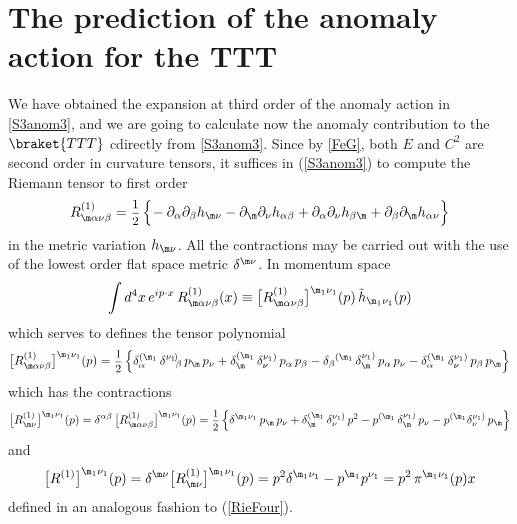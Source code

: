 \documentclass[a4paper,11pt,openright,twoside]{book}
\let\a=\alpha   \let\b=\beta   \let\g=\gamma   \let\d=\delta
\let\n=\nu      \let\x=\xi     \let\p=\pi      \let\r=\rho
\newcommand{\sdfrac}[2]{\mbox{\small$\displaystyle\frac{#1}{#2}$}}
\numberwithin{equation}{section}
\begin{document}
{{\section{The prediction of the anomaly action for the TTT}
\label{Sec:AnomTTT}
{
We have obtained the expansion at third order of the anomaly action in \eqref{S3anom3}, and we are going to calculate now the anomaly contribution to the $\braket{TTT}$ cdirectly from \eqref{S3anom3}. Since by \eqref{FeG}, both $E$ and $C^2$ are second order in curvature tensors, it suffices in (\ref{S3anom3}) to compute the Riemann tensor to first order
\begin{equation}
	R_{\m\a\n\beta}^{(1)} = \sdfrac{1}{2}\, \Big\{\!- \partial_\a\partial_\beta h_{\m\n}- \partial_\m\partial_\n h_{\a\beta} + \partial_\a\partial_\n h_{\b\m}
	+ \partial_\b\partial_\m h_{\a\n}\Big\}
\end{equation}
in the metric variation $h_{\m\n}$. All the contractions may be carried out with the use of the lowest order
flat space metric $\delta^{\m\n}$. In momentum space
\begin{equation}
	\int d^4x \, e^{ip\cdot x} \, R_{\m\a\n\b}^{(1)}(x) \equiv \big[R_{\m\a\n\b}^{(1)}\big]^{\m_1\n_1}(p)\, \tilde h_{\m_1\n_1}(p)
	\label{RieFour}
\end{equation}
which serves to defines the tensor polynomial
\begin{equation}
	\big[R_{\m\a\n\b}^{(1)}\big]^{\m_1\n_1}(p) = \sdfrac{1}{2}\, \Big\{\d^{(\m_1}_\a\, \d^{\n_1\!)\hspace{-4pt}}\,_\b\,p_\m\, p_\n
	+ \d^{(\m_1}_\m\, \d^{\n_1)}_\n\,p_\a\, p_\b  - \d_\b\,^{\hspace{-2pt}(\m_1}\, \d^{\n_1)}_\m\,p_\a \,p_\n - \d^{(\m_1}_\a\, \d^{\n_1)}_\n\,p_\b \,p_\m  \Big\}
	\label{Riemom}
\end{equation}
which has the contractions
\begin{equation}
	\big[R^{(1)}_{\m\n}\big]^{\m_1\n_1}(p) = \d^{\a\b}\, \big[R_{\m\a\n\b}^{(1)}\big]^{\m_1\n_1}(p)
	= \sdfrac{1}{2}\,\Big\{\d^{\m_1\n_1}\,p_\m\, p_\n  + \d^{(\m_1}_\m\, \d^{\n_1)}_\n\,p^2 
	- p^{(\m_1}\, \d^{\n_1)}_\m\,p_\n- p^{(\m_1} \d^{\n_1)}_\n\,p_\m \Big\} 
	\label{Riccip}
\end{equation}
and
\begin{equation}
	\big[R^{(1)}\big]^{\m_1\n_1}(p) = \d^{\m\n} \big[R^{(1)}_{\m\n}\big]^{\m_1\n_1}(p) = p^2 \d^{\m_1\n_1} - p^{\m_1}p^{\n_1}
	= p^2\,  \pi^{\m_1\n_1}(p)x
	\label{Ricscalp}
\end{equation}
defined in an analogous fashion to (\ref{RieFour}). 
}}}
\end{document}
